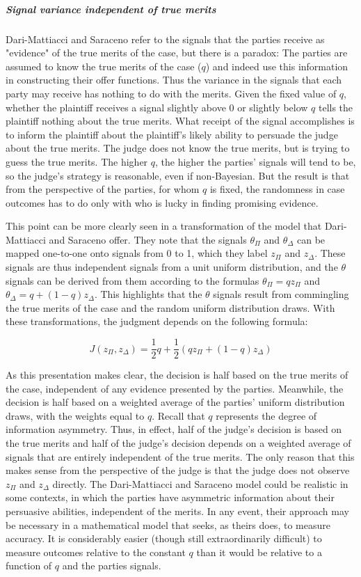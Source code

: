 \documentclass{article}
\begin{document}
\subparagraph{Signal variance independent of true merits}Dari-Mattiacci and Saraceno refer to the signals that the parties receive as "evidence" of the true merits of the case, but there is a paradox: The parties are assumed to know the true merits of the case ($q$) and indeed use this information in constructing their offer functions. Thus the variance in the signals that each party may receive has nothing to do with the merits. Given the fixed value of $q$, whether the plaintiff receives a signal slightly above 0 or slightly below $q$ tells the plaintiff nothing about the true merits. What receipt of the signal accomplishes is to inform the plaintiff about the plaintiff's likely ability to persuade the judge about the true merits. The judge does not know the true merits, but is trying to guess the true merits. The higher $q$, the higher the parties' signals will tend to be, so the judge's strategy is reasonable, even if non-Bayesian. But the result is that from the perspective of the parties, for whom $q$ is fixed, the randomness in case outcomes has to do only with who is lucky in finding promising evidence.

This point can be more clearly seen in a transformation of the model that Dari-Mattiacci and Saraceno offer. They note that the signals $\theta_\Pi$ and $\theta_\Delta$ can be mapped one-to-one onto signals from 0 to 1, which they label $z_\Pi$ and $z_\Delta$. These signals are thus independent signals from a unit uniform distribution, and the $\theta$ signals can be derived from them according to the formulas $\theta_\Pi = qz_\Pi$ and $\theta_\Delta=q+(1-q)z_\Delta$. This highlights that the $\theta$ signals result from commingling the true merits of the case and the random uniform distribution draws. With these transformations, the judgment depends on the following formula:

\begin{equation}
J(z_\Pi, z_\Delta) = \frac{1}{2}q + \frac{1}{2} (qz_\Pi+(1-q)z_\Delta)
\end{equation}

As this presentation makes clear, the decision is half based on the true merits of the case, independent of any evidence presented by the parties. Meanwhile, the decision is half based on a weighted average of the parties' uniform distribution draws, with the weights equal to $q$. Recall that $q$ represents the degree of information asymmetry. Thus, in effect, half of the judge's decision is based on the true merits and half of the judge's decision depends on a weighted average of signals that are entirely independent of the true merits. The only reason that this makes sense from the perspective of the judge is that the judge does not observe $z_\Pi$ and $z_\Delta$ directly. The Dari-Mattiacci and Saraceno model could be realistic in some contexts, in which the parties have asymmetric information about their persuasive abilities, independent of the merits. In any event, their approach may be necessary in a mathematical model that seeks, as theirs does, to measure accuracy. It is considerably easier (though still extraordinarily difficult) to measure outcomes relative to the constant $q$ than it would be relative to a function of $q$ and the parties signals. 
\end{document}
